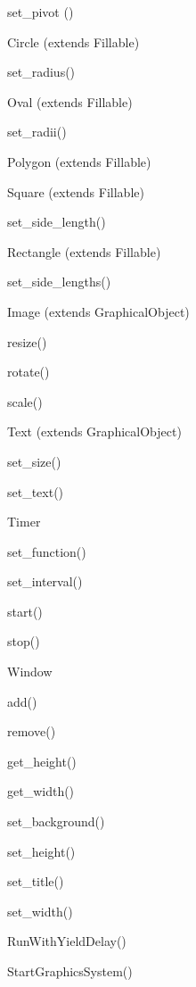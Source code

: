 \begin{DoxyItemize}
\begin{DoxyItemize}
\item set\+\_\+pivot ()
\end{DoxyItemize}
\item Circle (extends Fillable)
\begin{DoxyItemize}
\item set\+\_\+radius()
\end{DoxyItemize}
\item Oval (extends Fillable)
\begin{DoxyItemize}
\item set\+\_\+radii()
\end{DoxyItemize}
\item Polygon (extends Fillable)
\item Square (extends Fillable)
\begin{DoxyItemize}
\item set\+\_\+side\+\_\+length()
\end{DoxyItemize}
\item Rectangle (extends Fillable)
\begin{DoxyItemize}
\item set\+\_\+side\+\_\+lengths()
\end{DoxyItemize}
\item Image (extends Graphical\+Object)
\begin{DoxyItemize}
\item resize()
\item rotate()
\item scale()
\end{DoxyItemize}
\item Text (extends Graphical\+Object)
\begin{DoxyItemize}
\item set\+\_\+size()
\item set\+\_\+text()
\end{DoxyItemize}
\item Timer
\begin{DoxyItemize}
\item set\+\_\+function()
\item set\+\_\+interval()
\item start()
\item stop()
\end{DoxyItemize}
\item Window
\begin{DoxyItemize}
\item add()
\item remove()
\item get\+\_\+height()
\item get\+\_\+width()
\item set\+\_\+background()
\item set\+\_\+height()
\item set\+\_\+title()
\item set\+\_\+width()
\end{DoxyItemize}
\item Run\+With\+Yield\+Delay()
\item Start\+Graphics\+System()
\end{DoxyItemize}

